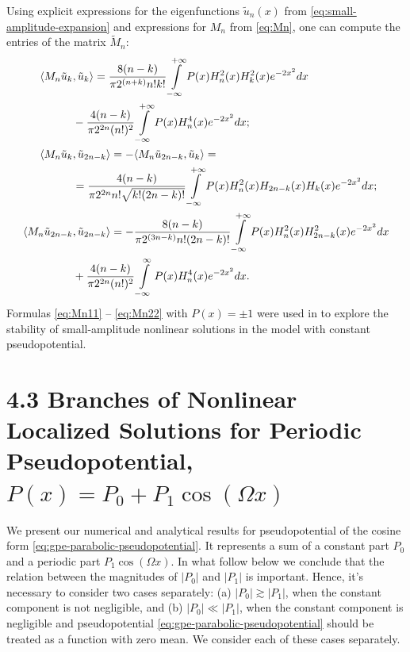 Using explicit expressions for the eigenfunctions $\tilde{u}_n(x)$ from \eqref{eq:small-amplitude-expansion} and expressions for $M_n$ from \eqref{eq:Mn}, one can compute the entries of the matrix $\widetilde{M}_n$:
\begin{align}
\langle M_n \tilde{u}_k &, \tilde{u}_k \rangle = \frac{8(n-k)}{\pi 2^{(n+k)} n! k!} \int \limits_{-\infty }^{+\infty} P(x) H_n^2(x) H_k^2(x) e^{-2 x^2} dx \notag \\ & - \frac{4(n-k)}{\pi 2^{2n}(n!)^2} \int \limits_{-\infty }^{+\infty} P(x) H_n^4(x) e^{-2 x^2} dx; \label{eq:Mn11} \\
\langle M_n \tilde{u}_k &, \tilde{u}_{2n-k} \rangle = -\langle M_n \tilde{u}_{2n-k}, \tilde{u}_k \rangle = \notag \\ & = \frac{4 (n-k)}{\pi 2^{2n} n! \sqrt{k! (2n-k)!}} \int \limits_{-\infty}^{+\infty} P(x) H_n^2(x) H_{2n-k}(x) H_k(x) e^{-2 x^2} dx;  \label{eq:Mn12} \\
\langle M_n \tilde{u}_{2n-k} &, \tilde{u}_{2n-k} \rangle = -\frac{8(n-k)}{\pi 2^{(3n-k)} n! (2n-k)!} \int \limits_{-\infty}^{+\infty} P(x) H_n^2(x) H_{2n-k}^2(x) e^{-2 x^2} dx \notag \\ & + \frac{4(n-k)}{\pi 2^{2n} (n!)^2} \int \limits_{-\infty}^{\infty} P(x) H_n^4(x) e^{-2 x^2} dx. \label{eq:Mn22}
\end{align}
Formulas \eqref{eq:Mn11} -- \eqref{eq:Mn22} with $P(x) = \pm 1$ were used in \cite{ZezyulinAlfimovKonotopPerecGarcia2008} to explore the stability of small-amplitude nonlinear solutions in the model with constant pseudopotential.

\section*{4.3 Branches of Nonlinear Localized Solutions for Periodic Pseudopotential, $P(x) = P_0 + P_1 \cos (\Omega x)$}

We present our numerical and analytical results for pseudopotential of the cosine form \eqref{eq:gpe-parabolic-pseudopotential}.
It represents a sum of a constant part $P_0$ and a periodic part $P_1 \cos (\Omega x)$.
In what follow below we conclude that the relation between the magnitudes of $|P_0|$ and $|P_1|$ is important.
Hence, it's necessary to consider two cases separately: (a) $|P_0| \gtrsim |P_1|$, when the constant component is not negligible, and (b) $|P_0| \ll |P_1|$, when the constant component is negligible and pseudopotential \eqref{eq:gpe-parabolic-pseudopotential} should be treated as a function with zero mean. 
We consider each of these cases separately.

